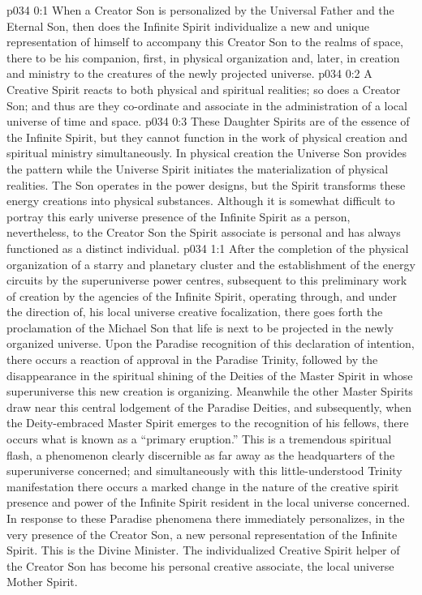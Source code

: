 \author{Mighty Messenger}
\vs p034 0:1 When a Creator Son is personalized by the Universal Father and the Eternal Son, then does the Infinite Spirit individualize a new and unique representation of himself to accompany this Creator Son to the realms of space, there to be his companion, first, in physical organization and, later, in creation and ministry to the creatures of the newly projected universe.
\vs p034 0:2 A Creative Spirit reacts to both physical and spiritual realities; so does a Creator Son; and thus are they co\hyp{}ordinate and associate in the administration of a local universe of time and space.
\vs p034 0:3 These Daughter Spirits are of the essence of the Infinite Spirit, but they cannot function in the work of physical creation and spiritual ministry simultaneously. In physical creation the Universe Son provides the pattern while the Universe Spirit initiates the materialization of physical realities. The Son operates in the power designs, but the Spirit transforms these energy creations into physical substances. Although it is somewhat difficult to portray this early universe presence of the Infinite Spirit as a person, nevertheless, to the Creator Son the Spirit associate is personal and has always functioned as a distinct individual.
\vs p034 1:1 After the completion of the physical organization of a starry and planetary cluster and the establishment of the energy circuits by the superuniverse power centres, subsequent to this preliminary work of creation by the agencies of the Infinite Spirit, operating through, and under the direction of, his local universe creative focalization, there goes forth the proclamation of the Michael Son that life is next to be projected in the newly organized universe. Upon the Paradise recognition of this declaration of intention, there occurs a reaction of approval in the Paradise Trinity, followed by the disappearance in the spiritual shining of the Deities of the Master Spirit in whose superuniverse this new creation is organizing. Meanwhile the other Master Spirits draw near this central lodgement of the Paradise Deities, and subsequently, when the Deity\hyp{}embraced Master Spirit emerges to the recognition of his fellows, there occurs what is known as a “primary eruption.” This is a tremendous spiritual flash, a phenomenon clearly discernible as far away as the headquarters of the superuniverse concerned; and simultaneously with this little\hyp{}understood Trinity manifestation there occurs a marked change in the nature of the creative spirit presence and power of the Infinite Spirit resident in the local universe concerned. In response to these Paradise phenomena there immediately personalizes, in the very presence of the Creator Son, a new personal representation of the Infinite Spirit. This is the Divine Minister. The individualized Creative Spirit helper of the Creator Son has become his personal creative associate, the local universe Mother Spirit.
